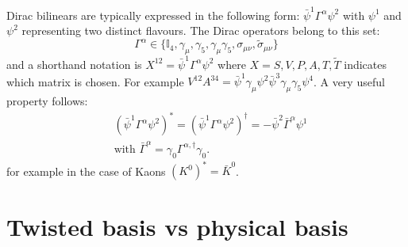 \documentclass[english, LaM, oneside, noexaminfo]{sapthesis}
\begin{document}
Dirac bilinears are typically expressed in the following form: $\bar \psi^1 \Gamma^\alpha \psi^2$ with $\psi^1$ and $\psi^2$ representing two distinct flavours.
The Dirac operators belong to this set:
\begin{equation*}
    \Gamma^{\alpha} \in \{\mathbb{I}_4,\gamma_\mu, \gamma_5, \gamma_\mu\gamma_5, \sigma_{\mu\nu}, \tilde\sigma_{\mu\nu} \}
\end{equation*}
and a shorthand notation is $X^{12} = \bar \psi^1 \Gamma^\alpha \psi^2$ where $X = S, V, P, A, T, \tilde{T}$ indicates which matrix is chosen.
For example $V^{12}A^{34} = \bar \psi^1 \gamma_\mu \psi^2 \bar \psi^3 \gamma_\mu \gamma_5 \psi^4$.
\newline
\newline
A very useful property \cite{Itzykson-Zuber} follows:
\begin{equation*}
    \begin{aligned}
        & \left( \bar\psi^1 \Gamma^\alpha \psi^2 \right)^* = \left( \bar\psi^1 \Gamma^\alpha \psi^2 \right)^\dag = -\bar\psi^2 \bar \Gamma^\alpha \psi^1 \\
        & \text{with } \bar \Gamma^\alpha = \gamma_0 \Gamma^{\alpha,\dag} \gamma_0.
    \end{aligned}
\end{equation*}
for example in the case of Kaons $\left(K^0\right)^* = \bar K^0$.

\chapter{Twisted basis vs physical basis}\label{app:physical-basis}
\end{document}
